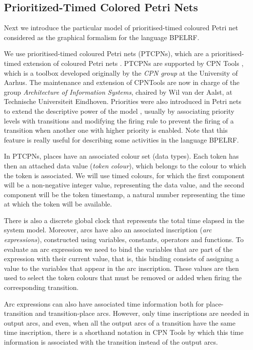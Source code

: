 \subsection{Prioritized-Timed Colored Petri Nets}\label{petrinet}

Next we introduce the particular model of prioritised-timed
coloured Petri net considered as the graphical formalism for the language BPELRF. 
 
We use prioritised-timed coloured Petri nets (PTCPNs), 
which are
a prioritised-timed extension of coloured Petri nets \cite{Jensen97}. PTCPNs 
are supported by CPN Tools \cite{CPNTools}, which is a toolbox
developed originally by the \emph{CPN group} at the University of Aarhus. The maintenance and extension of CPNTools are now in charge
of the group \emph{Architecture of Information Systems}, chaired by Wil van der Aalst, at Technische Universiteit Eindhoven.
Priorities were also introduced in Petri nets to extend the descriptive 
power of the model \cite{Bau96,BestK92,Pet81}, usually by
associating priority levels with transitions and modifying the firing
rule to prevent the firing of a transition when another one with
higher priority is enabled. Note that this feature is really useful  for describing some activities
in the language BPELRF.

In PTCPNs, places have an associated colour set (data types). 
Each token has then an attached data value
({\em token colour}),
which belongs to the colour to which the token is
associated. We will use timed colours, for which the first component
will be a non-negative integer value, representing the data value,
and the second component will be the token timestamp,
a natural number representing the time at which the 
token will be available.

There is also a discrete global clock that represents
the total time elapsed in the system model. Moreover, arcs have also 
an associated inscription ({\em arc expressions}),
constructed using variables, constants, operators
and functions. 
To evaluate an arc expression we need to
bind the variables that are part of the expression with their current value, that is, this binding
consists of assigning a value to the variables that appear in the
arc inscription. These values are then used to
select the token colours that must be removed or added when
firing the corresponding transition.

Arc expressions can also have associated time information
both for place-transition and transition-place arcs.
However, only time inscriptions are needed
in output arcs, and even, when all the output arcs
of a transition have the same time inscription,
there is a shorthand notation in CPN Tools
by which this time information is associated with
the transition instead of the output arcs.

